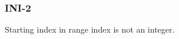 \subsubsection{INI-2}\label{sec:error_code_ini_2}

Starting index in range index is not an integer.


